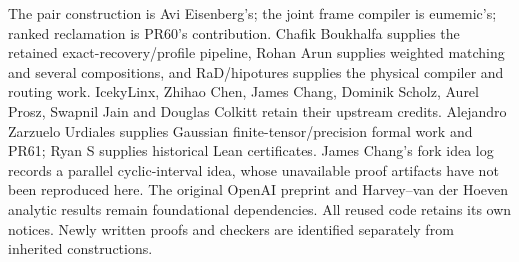 \documentclass[11pt]{article}
\begin{document}
The pair construction is Avi Eisenberg's; the joint frame compiler is
eumemic's; ranked reclamation is PR60's contribution. Chafik Boukhalfa supplies
the retained exact-recovery/profile pipeline, Rohan Arun supplies weighted
matching and several compositions, and RaD/hipotures supplies the physical
compiler and routing work. IcekyLinx, Zhihao Chen, James Chang, Dominik Scholz,
Aurel Prosz, Swapnil Jain and Douglas Colkitt retain their upstream credits.
Alejandro Zarzuelo Urdiales supplies Gaussian finite-tensor/precision formal
work and PR61; Ryan S supplies historical Lean certificates. James Chang's
fork idea log records a parallel cyclic-interval idea, whose unavailable
proof artifacts have not been reproduced here. The original OpenAI preprint
and Harvey--van der Hoeven analytic results remain foundational dependencies.
All reused code retains its own notices. Newly written proofs and checkers
are identified separately from inherited constructions.
\end{document}
